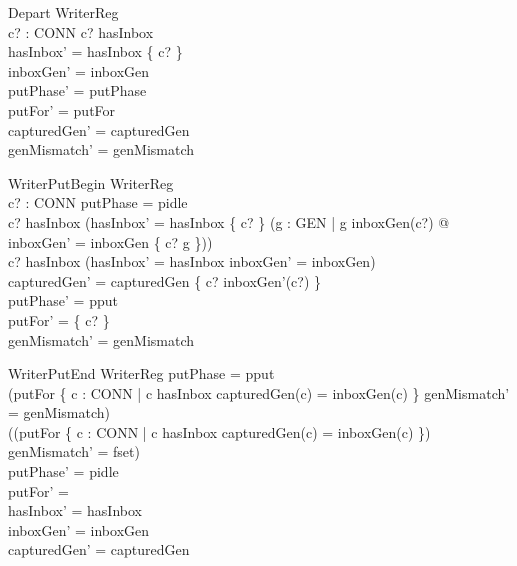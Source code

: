 \documentclass[a4paper,10pt,fleqn]{article}
\begin{document}
\begin{schema}{Depart}
  \Delta WriterReg \\
  c? : CONN
\where
  c? \in hasInbox \\
  hasInbox' = hasInbox \setminus \{ c? \} \\
  inboxGen' = inboxGen \\
  putPhase' = putPhase \\
  putFor' = putFor \\
  capturedGen' = capturedGen \\
  genMismatch' = genMismatch
\end{schema}


\begin{schema}{WriterPutBegin}
  \Delta WriterReg \\
  c? : CONN
\where
  putPhase = pidle \\
  c? \notin hasInbox \implies
    (hasInbox' = hasInbox \cup \{ c? \} \land
     (\exists g : GEN | g \neq inboxGen(c?) @
       inboxGen' = inboxGen \oplus \{ c? \mapsto g \})) \\
  c? \in hasInbox \implies
    (hasInbox' = hasInbox \land inboxGen' = inboxGen) \\
  capturedGen' = capturedGen \oplus \{ c? \mapsto inboxGen'(c?) \} \\
  putPhase' = pput \\
  putFor' = \{ c? \} \\
  genMismatch' = genMismatch
\end{schema}

\begin{schema}{WriterPutEnd}
  \Delta WriterReg
\where
  putPhase = pput \\
  (putFor \subseteq
     \{ c : CONN | c \in hasInbox \land capturedGen(c) = inboxGen(c) \}
   \implies genMismatch' = genMismatch) \\
  (\lnot (putFor \subseteq
     \{ c : CONN | c \in hasInbox \land capturedGen(c) = inboxGen(c) \})
   \implies genMismatch' = fset) \\
  putPhase' = pidle \\
  putFor' = \emptyset \\
  hasInbox' = hasInbox \\
  inboxGen' = inboxGen \\
  capturedGen' = capturedGen
\end{schema}
\end{document}
